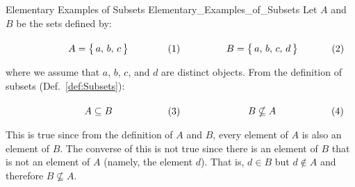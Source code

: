         \begin{fexample}{Elementary Examples of Subsets}
                        {Elementary_Examples_of_Subsets}
            Let $A$ and $B$ be the sets defined by:
            \par\hfill\par
            \begin{subequations}
                \begin{minipage}[b]{0.49\textwidth}
                    \begin{equation}
                        A=\big\{\,a,\,b,\,c\,\big\}
                    \end{equation}
                \end{minipage}
                \hfill
                \begin{minipage}[b]{0.49\textwidth}
                    \begin{equation}
                        B=\big\{\,a,\,b,\,c,\,d\,\big\}
                    \end{equation}
                \end{minipage}
            \end{subequations}
            \par\vspace{2.5ex}
            where we assume that $a$, $b$, $c$, and $d$ are distinct objects.
            From the definition of subsets (Def.~\ref{def:Subsets}):
            \par\hfill\par
            \begin{subequations}
                \begin{minipage}[b]{0.49\textwidth}
                    \begin{equation}
                        A\subseteq{B}
                    \end{equation}
                \end{minipage}
                \hfill
                \begin{minipage}[b]{0.49\textwidth}
                    \begin{equation}
                        B\nsubseteq{A}
                    \end{equation}
                \end{minipage}
            \end{subequations}
            \par\vspace{2.5ex}
            This is true since from the definition of $A$ and $B$, every element
            of $A$ is also an element of $B$. The converse of this is not true
            since there is an element of $B$ that is not an element of $A$
            (namely, the element $d$). That is, $d\in{B}$ but $d\notin{A}$ and
            therefore $B\nsubseteq{A}$.
        \end{fexample}
